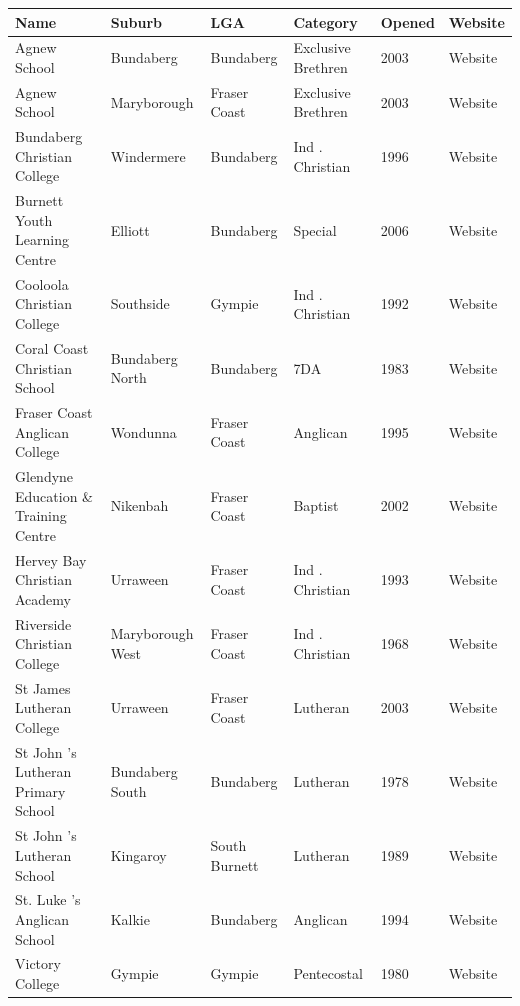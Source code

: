 \documentclass{article}
\begin{document}
\begin{tabular}{llllll}
\toprule
Name & Suburb & LGA & Category & Opened & Website \\
\midrule
Agnew School & Bundaberg & Bundaberg & Exclusive Brethren & 2003 & Website \\
Agnew School & Maryborough & Fraser Coast & Exclusive Brethren & 2003 & Website \\
Bundaberg Christian College & Windermere & Bundaberg & Ind . Christian & 1996 & Website \\
Burnett Youth Learning Centre & Elliott & Bundaberg & Special & 2006 & Website \\
Cooloola Christian College & Southside & Gympie & Ind . Christian & 1992 & Website \\
Coral Coast Christian School & Bundaberg North & Bundaberg & 7DA & 1983 & Website \\
Fraser Coast Anglican College & Wondunna & Fraser Coast & Anglican & 1995 & Website \\
Glendyne Education \& Training Centre & Nikenbah & Fraser Coast & Baptist & 2002 & Website \\
Hervey Bay Christian Academy & Urraween & Fraser Coast & Ind . Christian & 1993 & Website \\
Riverside Christian College & Maryborough West & Fraser Coast & Ind . Christian & 1968 & Website \\
St James Lutheran College & Urraween & Fraser Coast & Lutheran & 2003 & Website \\
St John 's Lutheran Primary School & Bundaberg South & Bundaberg & Lutheran & 1978 & Website \\
St John 's Lutheran School & Kingaroy & South Burnett & Lutheran & 1989 & Website \\
St. Luke 's Anglican School & Kalkie & Bundaberg & Anglican & 1994 & Website \\
Victory College & Gympie & Gympie & Pentecostal & 1980 & Website \\
\bottomrule
\end{tabular}
\end{document}

